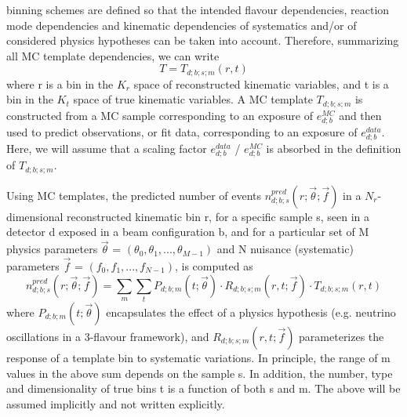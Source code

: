 binning schemes are defined so that the intended flavour dependencies, 
reaction mode dependencies and  kinematic dependencies of systematics 
and/or of considered physics hypotheses can be taken into account. 
Therefore, summarizing all MC template dependencies, we can write
\begin{equation}
   T = T_{d;b;s;m}(r,t)
\label{eq:template_deps}
\end{equation}
where r is a bin in the {\bf $K_{r}$} space of reconstructed kinematic variables, and
t is a bin in the {\bf $K_{t}$}  space of true kinematic variables.
A MC template $T_{d;b;s;m}$ is constructed from a MC sample corresponding to an
exposure of $e_{d;b}^{MC}$ and then used to predict observations, or fit data,
corresponding to an exposure of $e_{d;b}^{data}$. Here, we will assume that a
scaling factor $e_{d;b}^{data}$ / $e_{d;b}^{MC}$ is absorbed in the definition of $T_{d;b;s;m}$.

Using MC templates, the predicted number of events 
$n_{d;b;s}^{pred}(r; \vec{\theta}; \vec{f})$ 
in a $N_{r}$-dimensional reconstructed kinematic bin r, 
for a specific sample s, seen in a detector d exposed in a beam configuration b,
and for a particular set of 
M physics parameters $\vec{\theta}$ = $(\theta_0, \theta_1,..., \theta_{M-1})$ and
N nuisance (systematic) parameters $\vec{f}$ = $(f_0, f_1, ..., f_{N-1})$,
is computed as
\begin{equation}
n_{d;b;s}^{pred}(r; \vec{\theta}; \vec{f}) =
   \sum_{m} \sum_{t}  P_{d;b;m}(t; \vec{\theta}) \cdot R_{d;b;s;m}(r,t; \vec{f}) \cdot T_{d;b;s;m}(r,t)
\label{eq:valor_npred}
\end{equation}
where 
$P_{d;b;m}(t; \vec{\theta})$ encapsulates the effect of a physics hypothesis (e.g. neutrino oscillations in a 3-flavour framework), and $R_{d;b;s;m}(r,t; \vec{f})$ 
parameterizes the response of a template bin to systematic variations.
In principle, the range of m values in the above sum depends on the sample s.
In addition, the number, type and dimensionality of true bins t is a function of both s and m. 
The above will be assumed implicitly and not written explicitly.

